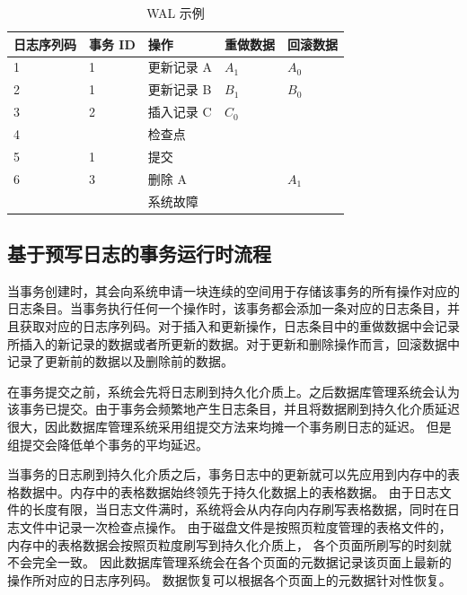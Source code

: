 \begin{table}
    \centering
    \caption{WAL 示例}
    \begin{tabular}{lllll}
        \toprule
        日志序列码 & 事务 ID & 操作       & 重做数据 & 回滚数据 \\
        \midrule
        1          & 1       & 更新记录 A & $A_1$    & $A_0$    \\
        2          & 1       & 更新记录 B & $B_1$    & $B_0$    \\
        3          & 2       & 插入记录 C & $C_0$    &          \\
        4          &         & 检查点     &          &          \\
        5          & 1       & 提交       &          &          \\
        6          & 3       & 删除 A     &          & $A_1$    \\
                   &         & 系统故障   &          &          \\
        \bottomrule
    \end{tabular}
    \label{tab:wal}
\end{table}

\subsection{基于预写日志的事务运行时流程}

当事务创建时，其会向系统申请一块连续的空间用于存储该事务的所有操作对应的日志条目。当事务执行任何一个操作时，该事务都会添加一条对应的日志条目，并且获取对应的日志序列码。对于插入和更新操作，日志条目中的重做数据中会记录所插入的新记录的数据或者所更新的数据。对于更新和删除操作而言，回滚数据中记录了更新前的数据以及删除前的数据。

在事务提交之前，系统会先将日志刷到持久化介质上。之后数据库管理系统会认为该事务已提交。由于事务会频繁地产生日志条目，并且将数据刷到持久化介质延迟很大，因此数据库管理系统采用组提交方法来均摊一个事务刷日志的延迟。
但是组提交会降低单个事务的平均延迟。

当事务的日志刷到持久化介质之后，事务日志中的更新就可以先应用到内存中的表格数据中。内存中的表格数据始终领先于持久化数据上的表格数据。
由于日志文件的长度有限，当日志文件满时，系统将会从内存向内存刷写表格数据，同时在日志文件中记录一次检查点操作。
由于磁盘文件是按照页粒度管理的表格文件的，内存中的表格数据会按照页粒度刷写到持久化介质上，
各个页面所刷写的时刻就不会完全一致。
因此数据库管理系统会在各个页面的元数据记录该页面上最新的操作所对应的日志序列码。
数据恢复可以根据各个页面上的元数据针对性恢复。


